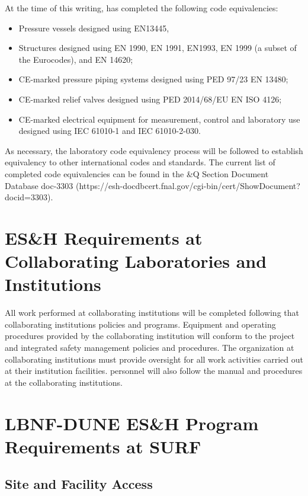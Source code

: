 At the time of this writing, \fnal has completed the following code
equivalencies:
\begin{itemize}
 \item Pressure vessels designed using EN13445,
 \item Structures designed using EN 1990, EN 1991, EN1993, EN 1999 (a
   subset of the Eurocodes), and EN 14620;
 \item CE-marked pressure piping systems designed using PED 97/23 EN 13480;
 \item CE-marked relief valves designed using PED 2014/68/EU EN ISO 4126;
 \item CE-marked electrical equipment for measurement, control and
   laboratory use designed using IEC 61010-1 and IEC 61010-2-030.
\end{itemize}

As necessary, the laboratory code equivalency process will be followed
to establish equivalency to other international codes and
standards. The current list of completed code equivalencies can be
found in the \&Q Section Document Database doc-3303
(https://esh-docdbcert.fnal.gov/cgi-bin/cert/ShowDocument?docid=3303).


\section{ES\&H Requirements at Collaborating Laboratories and Institutions}

All work performed at collaborating institutions will be completed
following that collaborating institutions  policies and
programs. Equipment and operating procedures provided by the
collaborating institution will conform to the  project
 and integrated safety management policies and
procedures. The  organization at collaborating institutions
must provide  oversight for all work activities carried
out at their institution facilities. 
personnel will also follow the  manual and procedures at
the collaborating institutions.

\section{LBNF-DUNE ES\&H Program Requirements at SURF}

\subsection{Site and Facility Access}

